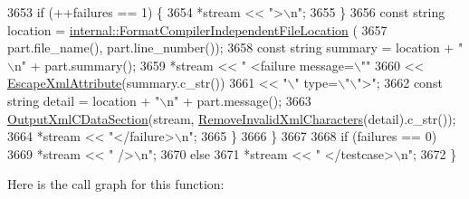 \begin{DoxyCode}
3653       \textcolor{keywordflow}{if} (++failures == 1) \{
3654         *stream << \textcolor{stringliteral}{">\(\backslash\)n"};
3655       \}
3656       \textcolor{keyword}{const} \textcolor{keywordtype}{string} location = \hyperlink{namespacetesting_1_1internal_a1ee4cde97868c53e442d3182496a9f3c}{internal::FormatCompilerIndependentFileLocation}
      (
3657           part.file\_name(), part.line\_number());
3658       \textcolor{keyword}{const} \textcolor{keywordtype}{string} summary = location + \textcolor{stringliteral}{"\(\backslash\)n"} + part.summary();
3659       *stream << \textcolor{stringliteral}{"      <failure message=\(\backslash\)""}
3660               << \hyperlink{classtesting_1_1internal_1_1XmlUnitTestResultPrinter_aad574d7bb0c24578d5acc57817b9d367}{EscapeXmlAttribute}(summary.c\_str())
3661               << \textcolor{stringliteral}{"\(\backslash\)" type=\(\backslash\)"\(\backslash\)">"};
3662       \textcolor{keyword}{const} \textcolor{keywordtype}{string} detail = location + \textcolor{stringliteral}{"\(\backslash\)n"} + part.message();
3663       \hyperlink{classtesting_1_1internal_1_1XmlUnitTestResultPrinter_a41bccd75f54932c5b3b8cce1f94dbd54}{OutputXmlCDataSection}(stream, 
      \hyperlink{classtesting_1_1internal_1_1XmlUnitTestResultPrinter_aa14cb72f42a346841482cbafa65e3155}{RemoveInvalidXmlCharacters}(detail).c\_str());
3664       *stream << \textcolor{stringliteral}{"</failure>\(\backslash\)n"};
3665     \}
3666   \}
3667 
3668   \textcolor{keywordflow}{if} (failures == 0)
3669     *stream << \textcolor{stringliteral}{" />\(\backslash\)n"};
3670   \textcolor{keywordflow}{else}
3671     *stream << \textcolor{stringliteral}{"    </testcase>\(\backslash\)n"};
3672 \}
\end{DoxyCode}
Here is the call graph for this function\+:
\nopagebreak
